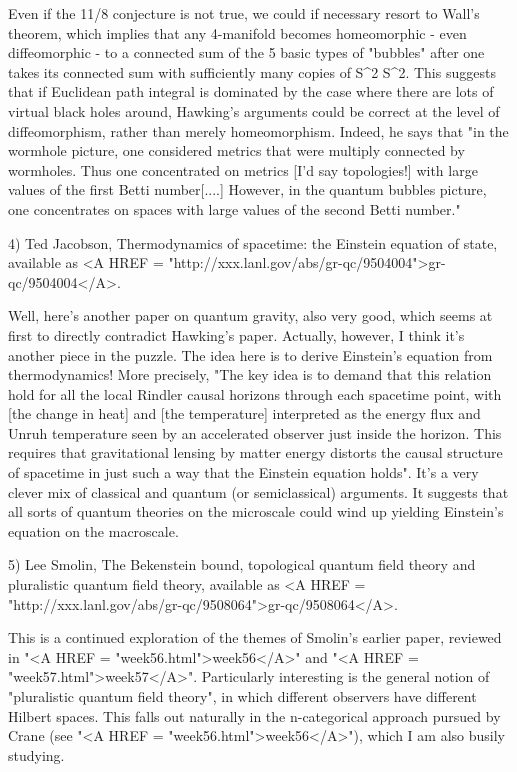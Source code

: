 Even if the 11/8 conjecture is not true, we could if necessary resort
to Wall's theorem, which implies that any 4-manifold becomes
homeomorphic - even diffeomorphic - to a connected sum of the 5
basic types of "bubbles" after one takes its connected sum with
sufficiently many copies of S^{2} \times  S^{2}.  This
suggests that if Euclidean path integral is dominated by the case
where there are lots of virtual black holes around, Hawking's
arguments could be correct at the level of diffeomorphism, rather than
merely homeomorphism.  Indeed, he says that "in the wormhole picture,
one considered metrics that were multiply connected by wormholes.
Thus one concentrated on metrics [I'd say topologies!] with large
values of the first Betti number[....]  However, in the quantum
bubbles picture, one concentrates on spaces with large values of the
second Betti number."

4) Ted Jacobson, Thermodynamics of spacetime: the Einstein equation of
state, available as <A HREF =
"http://xxx.lanl.gov/abs/gr-qc/9504004">gr-qc/9504004</A>.   

Well, here's another paper on quantum gravity, also very good, which
seems at first to directly contradict Hawking's paper.  Actually,
however, I think it's another piece in the puzzle.  The idea here is to
derive Einstein's equation from thermodynamics!  More precisely, "The
key idea is to demand that this relation hold for all the local Rindler
causal horizons through each spacetime point, with [the change in heat]
and [the temperature] interpreted as the energy flux and Unruh
temperature seen by an accelerated observer just inside the horizon.  
This requires that gravitational lensing by matter energy distorts the
causal structure of spacetime in just such a way that the Einstein
equation holds".  It's a very clever mix of classical and quantum (or
semiclassical) arguments.  It suggests that all sorts of quantum
theories on the microscale could wind up yielding Einstein's equation on
the macroscale.  

5) Lee Smolin, The Bekenstein bound, topological quantum field theory
and pluralistic quantum field theory, available as
<A HREF = "http://xxx.lanl.gov/abs/gr-qc/9508064">gr-qc/9508064</A>.

This is a continued exploration of the themes of Smolin's earlier paper,
reviewed in "<A HREF = "week56.html">week56</A>" and "<A HREF = "week57.html">week57</A>".  Particularly interesting is the
general notion of "pluralistic quantum field theory", in which different
observers have different Hilbert spaces.  This falls out naturally in
the n-categorical approach pursued by Crane (see "<A HREF = "week56.html">week56</A>"), which I am
also busily studying.  

